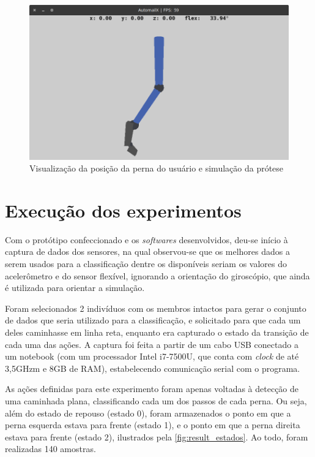 \begin{figure}[ht]
	\caption{\label{fig:result_simulacao}Visualização da posição da perna do usuário e simulação da prótese}
	\begin{center}
	    \includegraphics[width=.8\textwidth]{resources/result_simulacao}
	\end{center}
\end{figure}

\section{Execução dos experimentos}\label{sec:result_execucao}

Com o protótipo confeccionado e os \textit{softwares} desenvolvidos, deu-se início à captura de dados dos sensores, na qual observou-se que os melhores dados a serem usados para a classificação dentre os disponíveis seriam os valores do acelerômetro e do sensor flexível, ignorando a orientação do giroscópio, que ainda é utilizada para orientar a simulação.

Foram selecionados 2 indivíduos com os membros intactos para gerar o conjunto de dados que seria utilizado para a classificação, e solicitado para que cada um deles caminhasse em linha reta, enquanto era capturado o estado da transição de cada uma das ações. A captura foi feita a partir de um cabo USB conectado a um notebook (com um processador Intel i7-7500U, que conta com \textit{clock} de até 3,5GHzm e 8GB de RAM), estabelecendo comunicação serial com o programa.

As ações definidas para este experimento foram apenas voltadas à detecção de uma caminhada plana, classificando cada um dos passos de cada perna. Ou seja, além do estado de repouso (estado 0), foram armazenados o ponto em que a perna esquerda estava para frente (estado 1), e o ponto em que a perna direita estava para frente (estado 2), ilustrados pela \autoref{fig:result_estados}. Ao todo, foram realizadas 140 amostras.

